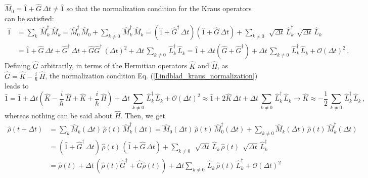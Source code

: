 \documentclass[11pt]{article}
\numberwithin{equation}{section} %
\numberwithin{figure}{section} %
\begin{document}
\begin{appendices}
$\hat{M}_{0}=\hat{1}+\hat{G}\,\Delta t \neq \hat{1}$ so that the normalization condition for the Kraus operators can be satisfied:
\begin{equation} \label{Lindblad_kraus_normalization}
\begin{split}
\hat{1}
&=\sum_k\,\hat{M}_{k}^\dagger\,\hat{M}_{k} = \hat{M}_{0}^\dagger\,\hat{M}_{0} + \sum_{k\neq 0}\,\hat{M}_{k}^\dagger\,\hat{M}_{k} = (\hat{1}+\hat{G}^\dagger\,\Delta t)(\hat{1}+\hat{G}\,\Delta t) + \sum_{k\neq 0}\,\sqrt[]{\Delta t}\,\hat{L}_k^\dagger\,\sqrt[]{\Delta t}\,\hat{L}_k\\
&=\hat{1}+\hat{G}\,\Delta t +\hat{G}^\dagger\,\Delta t + \hat{G}\hat{G}^\dagger\,(\Delta t)^2 + \Delta t\,\sum_{k\neq 0}\,\hat{L}_k^\dagger\,\hat{L}_k =\hat{1}+\Delta t(\hat{G}+\hat{G}^\dagger) + \Delta t\,\sum_{k\neq 0}\,\hat{L}_k^\dagger\,\hat{L}_k + \mathcal{O}(\Delta t)^2\,\textrm{.}
\end{split}
\end{equation}
Defining $\hat{G}$ arbitrarily, in terms of the Hermitian operators $\hat{K}$ and $\hat{H}$, as $\hat{G}=\hat{K}-\frac{i}{\hbar}\,\hat{H}$, the normalization condition Eq. (\ref{Lindblad_kraus_normalization}) leads to 
\begin{equation} \label{K_operator_lindblad}
\hat{1}=\hat{1}+\Delta t(\hat{K}-\frac{i}{\hbar}\,\hat{H}+\hat{K}+\frac{i}{\hbar}\,\hat{H}) + \Delta t\,\sum_{k\neq 0}\,\hat{L}_k^\dagger\,\hat{L}_k + \mathcal{O}(\Delta t)^2\approx\hat{1}+2\hat{K}\,\Delta t +\Delta t\,\sum_{k\neq 0}\,\hat{L}_k^\dagger\,\hat{L}_k \rightarrow \hat{K}\approx-\frac{1}{2}\,\sum_{k\neq 0}\,\hat{L}_k^\dagger\,\hat{L}_k\,\textrm{,}
\end{equation}
whereas nothing can be said about $\hat{H}$. Then, we get
\begin{equation}
\begin{split}
\hat{\rho}(t+\Delta t)
&=\sum_k\hat{M}_{k}(\Delta t)\,\hat{\rho}(t)\,\hat{M}_{k}^\dagger(\Delta t)=\hat{M}_{0}(\Delta t)\,\hat{\rho}(t)\,\hat{M}_{0}^\dagger(\Delta t) + \sum_{k\neq 0}\hat{M}_{k}(\Delta t)\,\hat{\rho}(t)\,\hat{M}_{k}^\dagger(\Delta t)\\ 
&= (\hat{1}+\hat{G}^\dagger\,\Delta t)\,\hat{\rho}(t)\,(\hat{1}+\hat{G}\,\Delta t) + \sum_{k\neq 0}\,\sqrt[]{\Delta t}\,\hat{L}_k\,\hat{\rho}(t)\,\sqrt[]{\Delta t}\,\hat{L}_k^\dagger\\
&=\hat{\rho}(t)+ \Delta t	\, \left(\hat{\rho}(t)\hat{G}^\dagger+\hat{G}\hat{\rho}(t)\right) + \Delta t \sum_{k\neq 0}\,\hat{L}_k\,\hat{\rho}(t)\,\hat{L}_k^\dagger + \mathcal{O}(\Delta t)^2\\

\end{split}
\end{equation}
\end{appendices}
\end{document}
